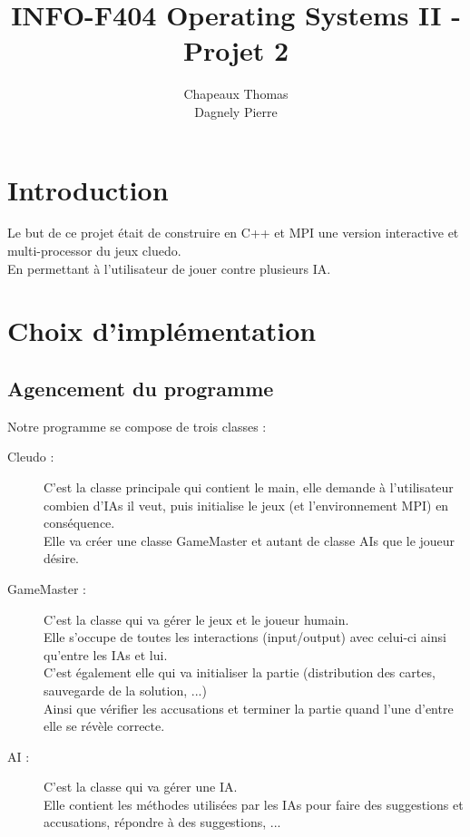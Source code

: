 \documentclass[a4paper,10pt]{article}
\title{INFO-F404 Operating Systems II - Projet 2}
\author{Chapeaux Thomas\\Dagnely Pierre}
\begin{document}
\maketitle

\section{Introduction}

	Le but de ce projet était de construire en C++ et MPI une version interactive et multi-processor du jeux cluedo.\\
	En permettant à l'utilisateur de jouer contre plusieurs IA.

\section{Choix d'implémentation}

	\subsection{Agencement du programme}
		Notre programme se compose de trois classes :
		\begin{description}
			\item[Cleudo :] C'est la classe principale qui contient le main, elle demande à l'utilisateur combien d'IAs il veut, puis initialise le jeux (et l’environnement MPI) en conséquence.\\
							Elle va créer une classe GameMaster et autant de classe AIs que le joueur désire.
			\item[GameMaster :] C'est la classe qui va gérer le jeux et le joueur humain.\\
							Elle s'occupe de toutes les interactions (input/output) avec celui-ci ainsi qu'entre les IAs et lui.\\
							C'est également elle qui va initialiser la partie (distribution des cartes, sauvegarde de la solution, ...)\\
							Ainsi que vérifier les accusations et terminer la partie quand l'une d'entre elle se révèle correcte.
			\item[AI :]	C'est la classe qui va gérer une IA.\\
							Elle contient les méthodes utilisées par les IAs pour faire des suggestions et accusations, répondre à des suggestions, ...
		\end{description}
		
\end{document}
